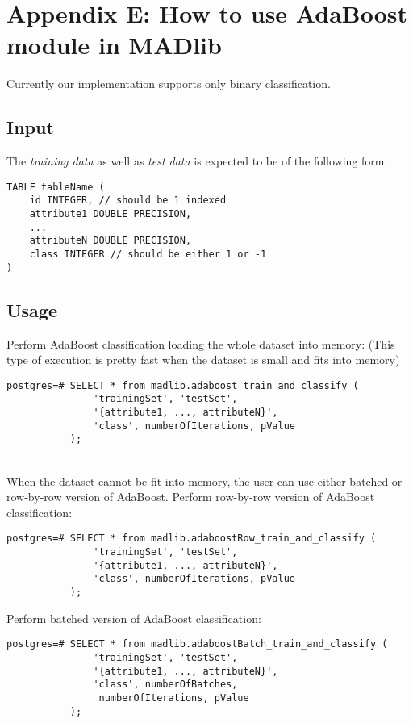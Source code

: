 \section*{Appendix E: How to use AdaBoost module in MADlib}
\label{sec:adaapp}
Currently our implementation supports only binary classification.

\subsection*{Input}
The {\itshape training data} as well as {\itshape test data} is expected to be of the following form:

\begin{verbatim}
TABLE tableName (
    id INTEGER, // should be 1 indexed
    attribute1 DOUBLE PRECISION,
    ...
    attributeN DOUBLE PRECISION,
    class INTEGER // should be either 1 or -1
)
\end{verbatim}

\subsection*{Usage}
Perform AdaBoost classification loading the whole dataset into memory: (This type of execution is pretty fast when the dataset is small and fits into memory)

\begin{verbatim}
postgres=# SELECT * from madlib.adaboost_train_and_classify (
               'trainingSet', 'testSet', 
               '{attribute1, ..., attributeN}', 
               'class', numberOfIterations, pValue
           );
\end{verbatim}

~~\\
When the dataset cannot be fit into memory, the user can use either batched or row-by-row version of AdaBoost.
\vspace{\baselineskip}
{\raggedleft Perform row-by-row version of AdaBoost classification:}

\begin{verbatim}
postgres=# SELECT * from madlib.adaboostRow_train_and_classify (
               'trainingSet', 'testSet', 
               '{attribute1, ..., attributeN}', 
               'class', numberOfIterations, pValue
           );
\end{verbatim}

{\raggedleft Perform batched version of AdaBoost classification:}

\begin{verbatim}
postgres=# SELECT * from madlib.adaboostBatch_train_and_classify (
               'trainingSet', 'testSet', 
               '{attribute1, ..., attributeN}', 
               'class', numberOfBatches,
                numberOfIterations, pValue
           );
\end{verbatim}

